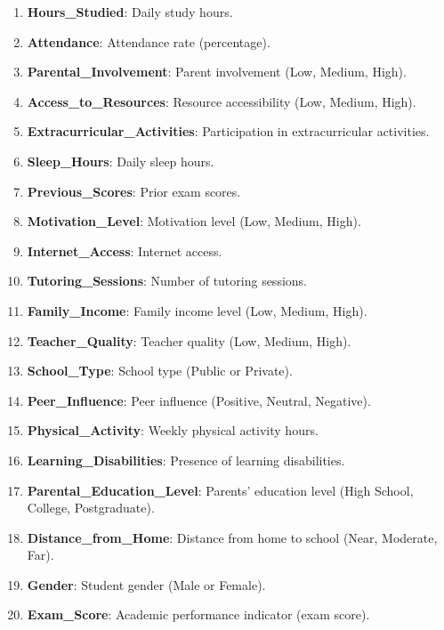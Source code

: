 \documentclass[11pt]{article}
\providecommand{\tightlist}{%
      \setlength{\itemsep}{0pt}\setlength{\parskip}{0pt}}
\begin{document}
\begin{enumerate}
\def\labelenumi{\arabic{enumi}.}
\tightlist
\item
  \textbf{Hours\_Studied}: Daily study hours.\\
\item
  \textbf{Attendance}: Attendance rate (percentage).\\
\item
  \textbf{Parental\_Involvement}: Parent involvement (Low, Medium,
  High).\\
\item
  \textbf{Access\_to\_Resources}: Resource accessibility (Low, Medium,
  High).\\
\item
  \textbf{Extracurricular\_Activities}: Participation in extracurricular
  activities.\\
\item
  \textbf{Sleep\_Hours}: Daily sleep hours.\\
\item
  \textbf{Previous\_Scores}: Prior exam scores.\\
\item
  \textbf{Motivation\_Level}: Motivation level (Low, Medium, High).\\
\item
  \textbf{Internet\_Access}: Internet access.\\
\item
  \textbf{Tutoring\_Sessions}: Number of tutoring sessions.\\
\item
  \textbf{Family\_Income}: Family income level (Low, Medium, High).\\
\item
  \textbf{Teacher\_Quality}: Teacher quality (Low, Medium, High).\\
\item
  \textbf{School\_Type}: School type (Public or Private).\\
\item
  \textbf{Peer\_Influence}: Peer influence (Positive, Neutral,
  Negative).\\
\item
  \textbf{Physical\_Activity}: Weekly physical activity hours.\\
\item
  \textbf{Learning\_Disabilities}: Presence of learning disabilities.\\
\item
  \textbf{Parental\_Education\_Level}: Parents' education level (High
  School, College, Postgraduate).\\
\item
  \textbf{Distance\_from\_Home}: Distance from home to school (Near,
  Moderate, Far).\\
\item
  \textbf{Gender}: Student gender (Male or Female).\\
\item
  \textbf{Exam\_Score}: Academic performance indicator (exam score).
\end{enumerate}
\end{document}
